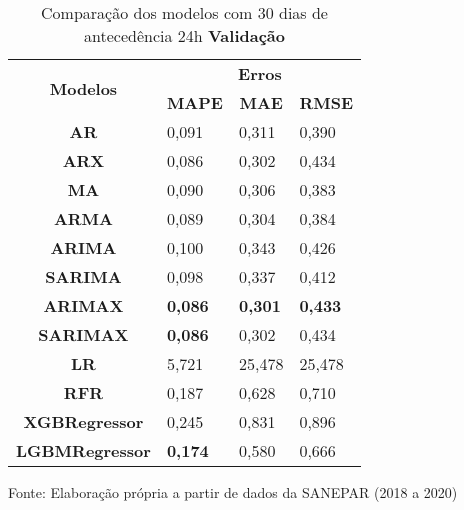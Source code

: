 \begin{table}[H]
	\centering
	\caption{Comparação dos modelos com 30 dias de antecedência 24h \textbf{Validação} }\label{tb:60-24vld}
	\begin{tabular}{@{}clll@{}}
		\toprule
		\multirow{2}{*}{\textbf{Modelos}} & \multicolumn{3}{c}{\textbf{Erros}}                                                                       \\ \cmidrule(l){2-4} 
		& \multicolumn{1}{c}{\textbf{MAPE}} & \multicolumn{1}{c}{\textbf{MAE}} & \multicolumn{1}{c}{\textbf{RMSE}} \\ \hline
\textbf{AR}                       & 0,091                             & 0,311                            & 0,390                             \\
\textbf{ARX}                      & 0,086                             & 0,302                            & 0,434                             \\
\textbf{MA}                       & 0,090                             & 0,306                            & 0,383                             \\
\textbf{ARMA}                     & 0,089                             & 0,304                            & 0,384                             \\
\textbf{ARIMA}                    & 0,100                             & 0,343                            & 0,426                             \\
\textbf{SARIMA}                   & 0,098                             & 0,337                            & 0,412                             \\
\textbf{ARIMAX}                   & \textbf{0,086}                             & \textbf{0,301}                            & \textbf{0,433}                             \\
\textbf{SARIMAX}                  & \textbf{0,086}                             & 0,302                            & 0,434                             \\
\textbf{LR}                       & 5,721                             & 25,478                           & 25,478                            \\
\textbf{RFR}                      & 0,187                             & 0,628                            & 0,710                             \\
\textbf{XGBRegressor}             & 0,245                             & 0,831                            & 0,896                             \\
\textbf{LGBMRegressor}            & \textbf{0,174}                             & 0,580                            & 0,666                             \\ \bottomrule
	\end{tabular}

Fonte: Elaboração própria a partir de dados da SANEPAR (2018 a 2020)
\end{table}

